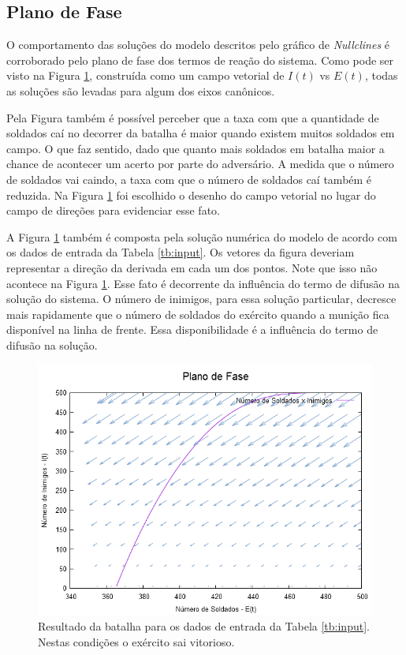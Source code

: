 \documentclass{article}
\begin{document}
\subsection{Plano de Fase}

O comportamento das soluções do modelo descritos pelo gráfico de \textit{Nullclines} é corroborado pelo plano de fase dos termos de reação do sistema. Como pode ser visto na Figura \ref{fig:phase-plane}, construída como um campo vetorial de $I(t)$ vs $E(t)$, todas as soluções são levadas para algum dos eixos canônicos.

Pela Figura também é possível perceber que a taxa com que a quantidade de soldados caí no decorrer da batalha é maior quando existem muitos soldados em campo. O que faz sentido, dado que quanto mais soldados em batalha maior a chance de acontecer um acerto por parte do adversário. A medida que o número de soldados vai caindo, a taxa com que o número de soldados caí também é reduzida. Na Figura \ref{fig:phase-plane} foi escolhido o desenho do campo vetorial no lugar do campo de direções para evidenciar esse fato.

A Figura \ref{fig:phase-plane} também é composta pela solução numérica do modelo de acordo com os dados de entrada da Tabela \ref{tb:input}. Os vetores da figura deveriam representar a direção da derivada em cada um dos pontos. Note que isso não acontece na Figura \ref{fig:phase-plane}. Esse fato é decorrente da influência do termo de difusão na solução do sistema. O número de inimigos, para essa solução particular, decresce mais rapidamente que o número de soldados do exército quando a munição fica disponível na linha de frente. Essa disponibilidade é a influência do termo de difusão na solução.

\begin{figure}[ht]
	\centering
	\includegraphics[scale=0.4]{figs/battle_phase_plane.png}
	\caption{Resultado da batalha para os dados de entrada da Tabela \ref{tb:input}. Nestas condições o exército sai vitorioso.}
	\label{fig:phase-plane}
\end{figure}
\end{document}
